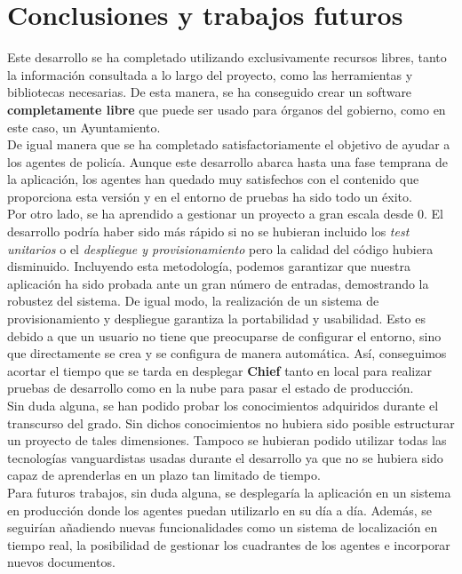\chapter{Conclusiones y trabajos futuros}

Este desarrollo se ha completado utilizando exclusivamente recursos libres, tanto la información consultada a lo largo del proyecto, como 
las herramientas y bibliotecas necesarias. De esta manera, se ha conseguido crear un software \textbf{completamente libre} que puede
ser usado para órganos del gobierno, como en este caso, un Ayuntamiento. \\

De igual manera que se ha completado satisfactoriamente el objetivo de ayudar a los agentes de policía. Aunque este desarrollo abarca hasta 
una fase temprana de la aplicación, los agentes han quedado muy satisfechos con el contenido que proporciona esta versión y en el entorno
de pruebas ha sido todo un éxito.\\

Por otro lado, se ha aprendido a gestionar un proyecto a gran escala desde 0. El desarrollo podría haber sido más rápido si no se hubieran 
incluido los \textit{test unitarios} o el \textit{despliegue y provisionamiento} pero la calidad del código hubiera disminuido. Incluyendo
esta metodología, podemos garantizar que nuestra aplicación ha sido probada ante un gran número de entradas, demostrando la robustez del sistema. 
De igual modo, la realización de un sistema de provisionamiento y despliegue garantiza la portabilidad y usabilidad. Esto es debido a que
un usuario no tiene que preocuparse de configurar el entorno, sino que directamente se crea y se configura de manera automática. Así, conseguimos
acortar el tiempo que se tarda en desplegar \textbf{Chief} tanto en local para realizar pruebas de desarrollo como en la nube para pasar el estado de
producción.\\

Sin duda alguna, se han podido probar los conocimientos adquiridos durante el transcurso del grado. Sin dichos conocimientos no hubiera sido
posible estructurar un proyecto de tales dimensiones. Tampoco se hubieran podido utilizar todas las tecnologías vanguardistas usadas durante 
el desarrollo ya que no se hubiera sido capaz de aprenderlas en un plazo tan limitado de tiempo.\\

Para futuros trabajos, sin duda alguna, se desplegaría la aplicación en un sistema en producción donde los agentes puedan utilizarlo en su día
a día. Además, se seguirían añadiendo nuevas funcionalidades como un sistema de localización en tiempo real, la posibilidad de gestionar los 
cuadrantes de los agentes e incorporar nuevos documentos.